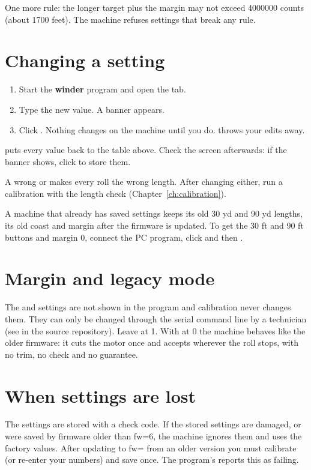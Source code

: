 One more rule: the longer target plus the margin may not exceed 4000000
counts (about 1700 feet). The machine refuses settings that break any rule.

\section{Changing a setting}
\begin{enumerate}
  \item Start the \textbf{winder} program and open the  tab.
  \item Type the new value. A banner  appears.
  \item Click . Nothing changes on the machine until
        you do.  throws your edits away.
\end{enumerate}
 puts every value back to the table above.
Check the screen afterwards: if the  banner shows, click
 to store them.

\begin{warning}
A wrong  or 
makes every roll the wrong length. After changing either, run a calibration
with the length check (Chapter~\ref{ch:calibration}).
\end{warning}

\begin{note}
A machine that already has saved settings keeps its old 30 yd and 90 yd
lengths, its old coast and margin after the firmware is updated. To get the
30 ft and 90 ft buttons and margin 0, connect the PC program, click
 and then .
\end{note}

\section{Margin and legacy mode}\label{sec:set-bump}
The  and  settings are not shown in the program
and calibration never changes them. They can only be changed through the
serial command line by a technician
(see  in the source repository).
Leave  at 1. With  at 0 the machine behaves like
the older firmware: it cuts the motor once and accepts wherever the roll
stops, with no trim, no  check and no guarantee.

\section{When settings are lost}\label{sec:settings-lost}
The settings are stored with a check code. If the stored settings are
damaged, or were saved by firmware older than fw=6, the machine ignores them
and uses the factory values. After updating to fw=\fwver{} from an older
version you must calibrate (or re-enter your numbers) and save once. The
program's  reports this as 
failing.
